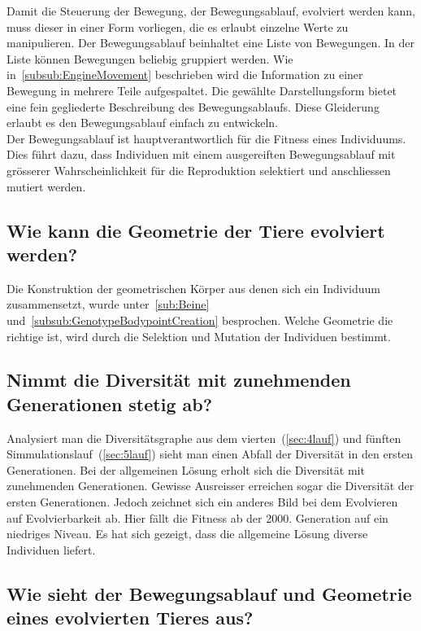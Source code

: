       Damit die Steuerung der Bewegung, der Bewegungsablauf, evolviert werden kann,
      muss dieser in einer Form vorliegen, die es erlaubt einzelne Werte zu manipulieren.
      Der Bewegungsablauf beinhaltet eine Liste von Bewegungen.
      In der Liste können Bewegungen beliebig gruppiert werden.
      Wie in~\vref{subsub:EngineMovement} beschrieben
      wird die Information zu einer Bewegung in mehrere Teile aufgespaltet.
      Die gewählte Darstellungsform bietet eine fein gegliederte Beschreibung des Bewegungsablaufs.
      Diese Gleiderung erlaubt es den Bewegungsablauf einfach zu entwickeln.
      \\
      Der Bewegungsablauf ist hauptverantwortlich für die Fitness eines Individuums.
      Dies führt dazu, dass Individuen mit einem ausgereiften Bewegungsablauf mit grösserer Wahrscheinlichkeit
      für die Reproduktion selektiert und anschliessen mutiert werden.
      \\

    \subsection{Wie kann die Geometrie der Tiere evolviert werden?}

      Die Konstruktion der geometrischen Körper aus denen sich ein Individuum zusammensetzt,
      wurde unter~\vref{sub:Beine} und~\vref{subsub:GenotypeBodypointCreation} besprochen.
      Welche Geometrie die richtige ist, wird durch die Selektion und Mutation der Individuen bestimmt.

    \subsection{Nimmt die Diversität mit zunehmenden Generationen stetig ab?}

      Analysiert man die Diversitätsgraphe aus dem vierten~(\vref{sec:4lauf}) und
      fünften Simmulationslauf~(\vref{sec:5lauf}) sieht man einen Abfall der Diversität in den ersten Generationen.
      Bei der allgemeinen Lösung erholt sich die Diversität mit zunehmenden Generationen.
      Gewisse Ausreisser erreichen sogar die Diversität der ersten Generationen.
      Jedoch zeichnet sich ein anderes Bild bei dem Evolvieren auf Evolvierbarkeit ab.
      Hier fällt die Fitness ab der 2000. Generation auf ein niedriges Niveau.
      Es hat sich gezeigt, dass die allgemeine Lösung diverse Individuen liefert.

    \subsection{Wie sieht der Bewegungsablauf und Geometrie eines evolvierten Tieres aus?}

